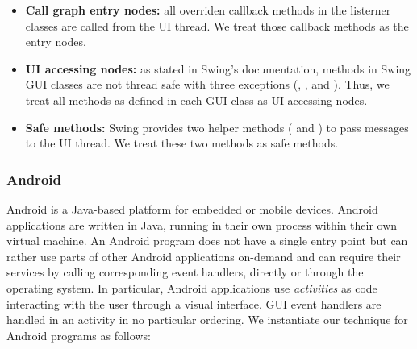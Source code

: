 \begin{itemize}

\item \textbf{Call graph entry nodes: } all overriden callback methods in the
listerner classes are called from the UI thread. We treat those callback
methods as the entry nodes.


\item \textbf{UI accessing nodes:} as stated in Swing's documentation, methods
in Swing GUI classes are not thread safe with three exceptions (,
, and ). Thus, we
treat all methods as defined in each GUI class as UI accessing nodes.

\item \textbf{Safe methods: }  Swing provides two helper methods
( and ) to pass messages to the UI thread.
We treat these two methods as safe methods.

\end{itemize}


\subsubsection{Android}

Android is a Java-based platform for embedded or mobile devices. 
Android applications are written in Java, running in their own process within their own virtual machine.
An Android program does not have a single entry point but can
rather use parts of other Android applications on-demand and can require their
services by calling corresponding event handlers, directly or through the
operating system. In particular, Android applications use \textit{activities}
as code interacting with the user through a visual interface. GUI event handlers
are handled in an activity  in no particular ordering.
We instantiate our technique for Android programs as follows:

